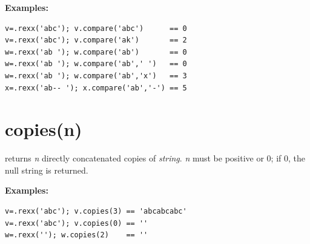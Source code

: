 \textbf{Examples:}
\begin{lstlisting}
v=.rexx('abc'); v.compare('abc')      == 0
v=.rexx('abc'); v.compare('ak')       == 2
w=.rexx('ab '); w.compare('ab')       == 0
w=.rexx('ab '); w.compare('ab',' ')   == 0
w=.rexx('ab '); w.compare('ab','x')   == 3
x=.rexx('ab-- '); x.compare('ab','-') == 5
\end{lstlisting}
\section{copies(n)}\label{refcopies}
returns \emph{n} directly concatenated copies of
\emph{string}.
\emph{n} must be positive or 0; if 0, the null string is returned.
 
\textbf{Examples:}
\begin{lstlisting}
v=.rexx('abc'); v.copies(3) == 'abcabcabc'
v=.rexx('abc'); v.copies(0) == ''
w=.rexx(''); w.copies(2)    == ''
\end{lstlisting}

 
 


